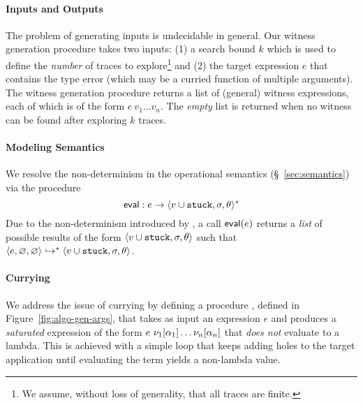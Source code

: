 \paragraph{Inputs and Outputs}
%
The problem of generating inputs is undecidable in general.
%
Our witness generation procedure takes two inputs:
%
(1) a search bound $k$ which is used to define the \emph{number} of
traces to explore\footnote{We assume, without loss of generality, that all
traces are finite.} and
%
(2) the target expression $e$ that contains the type error
(which may be a curried function of multiple arguments).
%
The witness generation procedure returns a list of (general)
witness expressions, each of which is of the form $e\ v_1 \ldots v_n$.
%
The \emph{empty} list is returned when no witness can be found after
exploring $k$ traces.


\paragraph{Modeling Semantics}
%
We resolve the non-determinism in the operational semantics
(\S~\ref{sec:semantics}) via the procedure
%
$$
\mathsf{eval} : e \rightarrow \langle v \cup \mathtt{stuck}, \sigma, \theta \rangle^{*}
$$
%
Due to the non-determinism introduced by \gensym, a call
$\mathsf{eval}(e)$ returns a \emph{list}
of possible results of the form $\langle v \cup \mathtt{stuck}, \sigma, \theta \rangle$
such that $\langle e, \varnothing, \varnothing \rangle \hookrightarrow^{*} \langle v \cup \mathtt{stuck}, \sigma, \theta \rangle{}$.

\paragraph{Currying}
We address the issue of currying by defining a procedure ,
defined in Figure~\ref{fig:algo-gen-args}, that takes as input an
expression $e$ and produces a \emph{saturated} expression of the form
$e\ \nu_1[\alpha_1] \ldots \nu_n[\alpha_n]$ that
\emph{does not} evaluate to a lambda.
%
This is achieved with a simple loop that keeps adding holes to the
target application until evaluating the term yields a non-lambda value.
%
%

